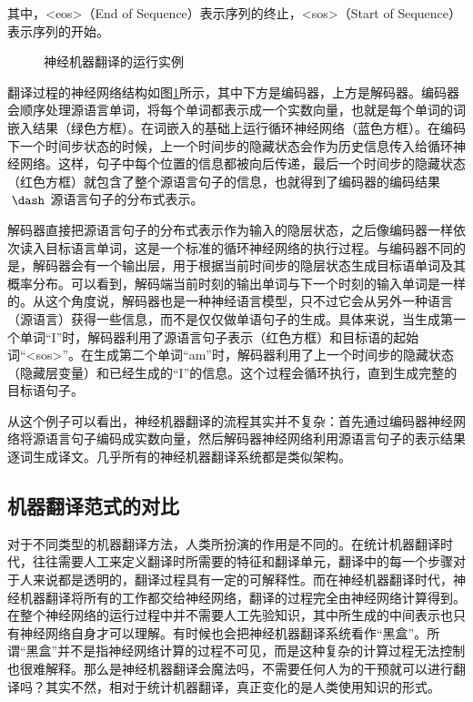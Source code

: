 \noindent 其中，<eos>（End of Sequence）表示序列的终止，<sos>（Start of Sequence）表示序列的开始。

\begin{figure}[htp]
\centering

\caption{神经机器翻译的运行实例}
\label{fig:6-7}
\end{figure}

\parinterval 翻译过程的神经网络结构如图\ref{fig:6-7}所示，其中下方是编码器，上方是解码器。编码器会顺序处理源语言单词，将每个单词都表示成一个实数向量，也就是每个单词的词嵌入结果（绿色方框）。在词嵌入的基础上运行循环神经网络（蓝色方框）。在编码下一个时间步状态的时候，上一个时间步的隐藏状态会作为历史信息传入给循环神经网络。这样，句子中每个位置的信息都被向后传递，最后一个时间步的隐藏状态（红色方框）就包含了整个源语言句子的信息，也就得到了编码器的编码结果$\ \dash\ $源语言句子的分布式表示。

\parinterval 解码器直接把源语言句子的分布式表示作为输入的隐层状态，之后像编码器一样依次读入目标语言单词，这是一个标准的循环神经网络的执行过程。与编码器不同的是，解码器会有一个输出层，用于根据当前时间步的隐层状态生成目标语单词及其概率分布。可以看到，解码端当前时刻的输出单词与下一个时刻的输入单词是一样的。从这个角度说，解码器也是一种神经语言模型，只不过它会从另外一种语言（源语言）获得一些信息，而不是仅仅做单语句子的生成。具体来说，当生成第一个单词``I''时，解码器利用了源语言句子表示（红色方框）和目标语的起始词``<sos>''。在生成第二个单词``am''时，解码器利用了上一个时间步的隐藏状态（隐藏层变量）和已经生成的``I''的信息。这个过程会循环执行，直到生成完整的目标语句子。

\parinterval 从这个例子可以看出，神经机器翻译的流程其实并不复杂：首先通过编码器神经网络将源语言句子编码成实数向量，然后解码器神经网络利用源语言句子的表示结果逐词生成译文。几乎所有的神经机器翻译系统都是类似架构。


\subsection{机器翻译范式的对比}

\parinterval 对于不同类型的机器翻译方法，人类所扮演的作用是不同的。在统计机器翻译时代，往往需要人工来定义翻译时所需要的特征和翻译单元，翻译中的每一个步骤对于人来说都是透明的，翻译过程具有一定的可解释性。而在神经机器翻译时代，神经机器翻译将所有的工作都交给神经网络，翻译的过程完全由神经网络计算得到。在整个神经网络的运行过程中并不需要人工先验知识，其中所生成的中间表示也只有神经网络自身才可以理解。有时候也会把神经机器翻译系统看作``黑盒''。所谓``黑盒''并不是指神经网络计算的过程不可见，而是这种复杂的计算过程无法控制也很难解释。那么是神经机器翻译会魔法吗，不需要任何人为的干预就可以进行翻译吗？其实不然，相对于统计机器翻译，真正变化的是人类使用知识的形式。

